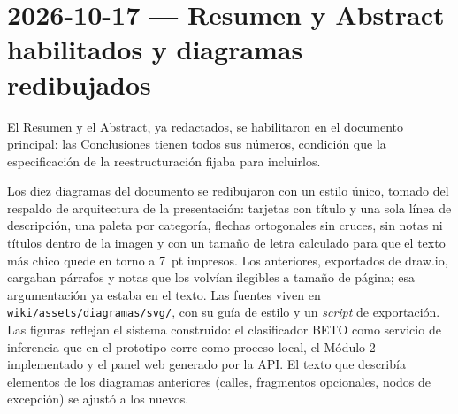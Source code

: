 \section{2026-10-17 — Resumen y Abstract habilitados y diagramas redibujados}

El Resumen y el Abstract, ya redactados, se habilitaron en el documento principal: las Conclusiones tienen todos sus números, condición que la especificación de la reestructuración fijaba para incluirlos.

Los diez diagramas del documento se redibujaron con un estilo único, tomado del respaldo de arquitectura de la presentación: tarjetas con título y una sola línea de descripción, una paleta por categoría, flechas ortogonales sin cruces, sin notas ni títulos dentro de la imagen y con un tamaño de letra calculado para que el texto más chico quede en torno a 7~pt impresos. Los anteriores, exportados de draw.io, cargaban párrafos y notas que los volvían ilegibles a tamaño de página; esa argumentación ya estaba en el texto. Las fuentes viven en \texttt{wiki/assets/diagramas/svg/}, con su guía de estilo y un \textit{script} de exportación. Las figuras reflejan el sistema construido: el clasificador BETO como servicio de inferencia que en el prototipo corre como proceso local, el Módulo 2 implementado y el panel web generado por la API. El texto que describía elementos de los diagramas anteriores (calles, fragmentos opcionales, nodos de excepción) se ajustó a los nuevos.

\bigskip
